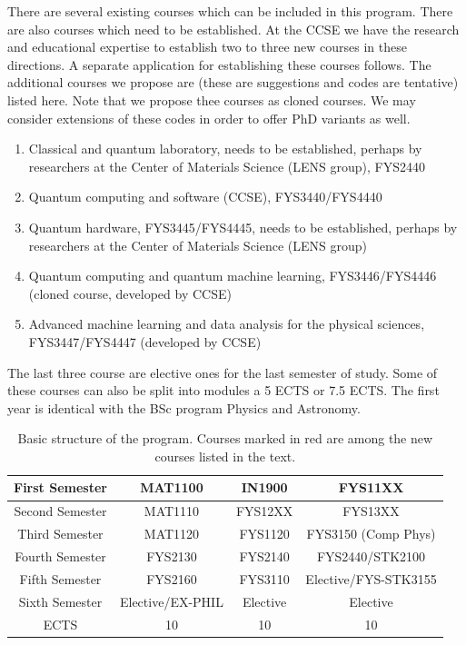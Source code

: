 \documentclass[aps,rmp,preprint,amsmath,amssymb,graphicx,longbibliography]{revtex4-1}
\begin{document}
There are several existing courses which can be included in this program. There are also courses which need to be established. At the CCSE we have the research and educational expertise to establish two to three new courses in these directions.
A separate application for establishing these courses follows. The additional courses we propose are (these are suggestions and codes are tentative) listed here. Note that we propose thee courses as cloned courses. We may consider extensions of these codes in order to offer PhD variants as well.



\begin{enumerate}
    \item \color{red} Classical and quantum laboratory, needs to be established, perhaps by researchers at the Center of Materials Science (LENS group), FYS2440
    \item Quantum computing and software (CCSE), FYS3440/FYS4440
    \item Quantum hardware, FYS3445/FYS4445, needs to be established, perhaps by researchers at the Center of Materials Science (LENS group)
    \item Quantum computing and quantum machine learning, FYS3446/FYS4446 (cloned course, developed by CCSE)
    \item Advanced machine learning and data analysis for the physical sciences, FYS3447/FYS4447 (developed by CCSE)
\end{enumerate}

The last three course are elective ones for the last semester of study. Some of these courses can also be split into modules a 5 ECTS or 7.5 ECTS.
The first year is identical with the BSc program Physics and Astronomy.

\begin{table}
 \caption{Basic structure of the program. Courses marked in red are among the new courses listed in the text.}
    \centering
    \begin{tabular}{|c|c|c|c|} \hline
    First Semester & MAT1100 &  IN1900   & FYS11XX  \\ \hline 
    Second Semester & MAT1110 & FYS12XX  & FYS13XX \\ \hline
    Third Semester & MAT1120 &   FYS1120  &  FYS3150 (Comp Phys)\\ \hline
    Fourth Semester & FYS2130 & FYS2140    & \color{red} {FYS2440}/STK2100 \\ \hline       
    Fifth Semester & FYS2160 & FYS3110     & \color{red}Elective/FYS-STK3155 \\ \hline
    Sixth Semester & \color{red} Elective/EX-PHIL & \color{red} Elective    & \color{red} Elective \\ \hline
   ECTS & 10 &  10   &  10  \\ \hline    
    \end{tabular}
\end{table}



\end{document}
